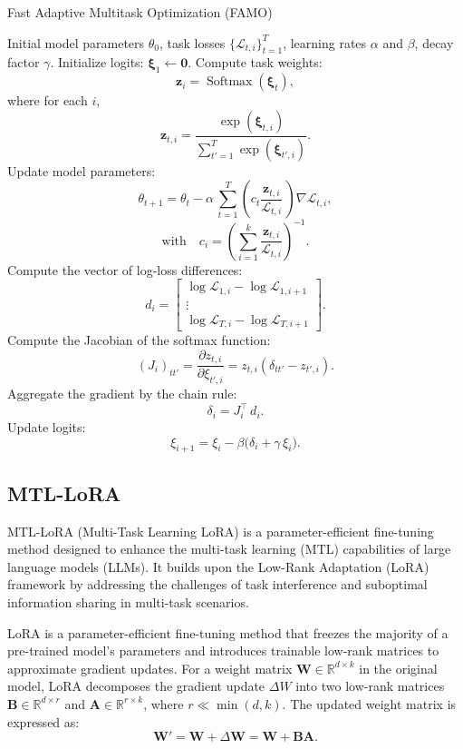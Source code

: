\begin{algorithm}[t]
\caption{Fast Adaptive Multitask Optimization (FAMO)}
\label{alg:famo}
\begin{algorithmic}[1]
\Require Initial model parameters $\theta_0$, task losses $\{\mathcal{L}_{t,i}\}_{t=1}^T$, learning rates $\alpha$ and $\beta$, decay factor $\gamma$.
\State Initialize logits: $\mathbf{\xi}_1 \gets \mathbf{0}$.
    \State Compute task weights: 
    \[
    \mathbf{z}_i = \operatorname{Softmax}(\mathbf{\xi}_t),
    \]
    where for each $i$, 
    \[
    \mathbf{z}_{t,i} = \frac{\exp(\mathbf{\xi}_{t,i})}{\sum_{t'=1}^T \exp(\mathbf{\xi}_{t',i})}.
    \]
    \State Update model parameters:
    \[
    \theta_{t+1} = \theta_t - \alpha\,  \sum_{t=1}^T \left( c_t \frac{\mathbf{z}_{t,i}}{\mathcal{L}_{t,i}}\,\right) \nabla \mathcal{L}_{t,i},
    \]
    \[
    \text{with} \quad
    c_i = \left(\sum_{i=1}^k \frac{\mathbf{z}_{t,i}}{\mathcal{L}_{t,i}} \right)^{-1}.
    \]
    \State Compute the vector of log-loss differences:
    \[
    d_i = \begin{bmatrix}
      \log \mathcal{L}_{1,i} - \log \mathcal{L}_{1,i+1} \\
      \vdots \\
      \log \mathcal{L}_{T,i} - \log \mathcal{L}_{T,i+1}
    \end{bmatrix}.
    \]
    \State Compute the Jacobian of the softmax function:
    \[
    (J_i)_{tt'} = \frac{\partial z_{t,i}}{\partial \xi_{t',i}} = z_{t,i} (\delta_{tt'} - z_{t',i}).
    \]
    \State Aggregate the gradient by the chain rule:
    \[
    \delta_i = J_i^\top\, d_i.
    \]
    \State Update logits:
    \[
    \xi_{i+1} = \xi_i - \beta \bigl( \delta_i + \gamma\, \xi_i \bigr).
    \]
\EndFor
\end{algorithmic}
\end{algorithm}



\subsection{MTL-LoRA}
MTL-LoRA (Multi-Task Learning LoRA) is a parameter-efficient fine-tuning method designed to enhance the multi-task learning (MTL) capabilities of large language models (LLMs). It builds upon the Low-Rank Adaptation (LoRA) framework by addressing the challenges of task interference and suboptimal information sharing in multi-task scenarios.

LoRA is a parameter-efficient fine-tuning method that freezes the majority of a pre-trained model's parameters and introduces trainable low-rank matrices to approximate gradient updates. For a weight matrix $\mathbf{W} \in \mathbb{R}^{d \times k}$ in the original model, LoRA decomposes the gradient update $\Delta W$ into two low-rank matrices $\mathbf{B} \in \mathbb{R}^{d \times r}$ and $\mathbf{A} \in \mathbb{R}^{r \times k}$, where $r \ll \min(d, k)$. The updated weight matrix is expressed as:
\[
\mathbf{W}' = \mathbf{W} + \Delta \mathbf{W} = \mathbf{W} + \mathbf{BA}.
\]

